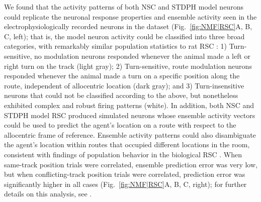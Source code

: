 We found that the activity patterns of both \ac{NSC} and \ac{STDPH} model neurons could replicate the neuronal response properties and ensemble activity seen in the electrophysiologically recorded neurons in the dataset (Fig.~\ref{fig:NMF|RSC}A, B, C, left); that is, the model neuron activity could be classified into three broad categories,
with remarkably similar population statistics to rat \ac{RSC} 
\citep{AlexanderNitz2015}:
1) Turn-sensitive, no modulation neurons responded whenever the animal made a left or right turn
   on the track (light gray);
2) Turn-sensitive, route modulation neurons responded whenever the animal made a turn on a specific position along
   the route, independent of allocentric location (dark gray); and
3) Turn-insensitive neurons that could not be classified according to the above,
   but nonetheless exhibited complex and robust firing patterns (white). In addition, both \ac{NSC} and \ac{STDPH} model \ac{RSC} produced simulated neurons whose ensemble activity vectors could be used to predict the agent's location on a route with respect to the allocentric frame of reference. Ensemble activity patterns could also disambiguate the agent's location within routes that occupied different locations in the room, consistent with findings of population behavior in the biological RSC \citep{AlexanderNitz2015}. When same-track position trials were correlated, ensemble prediction error was very low, but when conflicting-track position trials were correlated, prediction error was significantly higher in all cases (Fig.~\ref{fig:NMF|RSC}A, B, C, right); for further details on this analysis, see \citep{AlexanderNitz2015,Rounds2016}.
   



